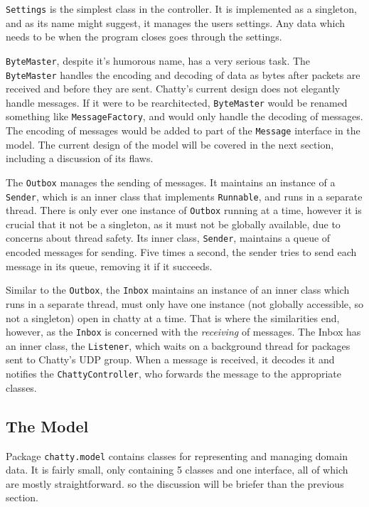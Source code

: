 \documentclass[oneside,article]{memoir}
\begin{document}
\texttt{Settings} is the simplest class in the controller. It is implemented
as a singleton, and as its name might suggest, it manages the users
settings. Any data which needs to be when the program closes goes
through the settings.

\texttt{ByteMaster}, despite it's humorous name, has a very serious task.
The \texttt{ByteMaster} handles the encoding and decoding of data as bytes
after packets are received and before they are sent. Chatty's current
design does not elegantly handle messages. If it were to be
rearchitected, \texttt{ByteMaster} would be renamed something like
\texttt{MessageFactory}, and would only handle the decoding of messages. The
encoding of messages would be added to part of the \texttt{Message} interface
in the model. The current design of the model will be covered in the
next section, including a discussion of its flaws.

The \texttt{Outbox} manages the sending of messages. It maintains an instance
of a \texttt{Sender}, which is an inner class that implements \texttt{Runnable}, and
runs in a separate thread. There is only ever one instance of
\texttt{Outbox} running at a time, however it is crucial that it not be a
singleton, as it must not be globally available, due to concerns about
thread safety. Its inner class, \texttt{Sender}, maintains a queue of
encoded messages for sending. Five times a second, the sender tries
to send each message in its queue, removing it if it succeeds.

Similar to the \texttt{Outbox}, the \texttt{Inbox} maintains an instance of an inner
class which runs in a separate thread, must only have one instance
(not globally accessible, so not a singleton) open in chatty at a
time. That is where the similarities end, however, as the \texttt{Inbox} is
concerned with the \emph{receiving} of messages. The Inbox has an inner
class, the \texttt{Listener}, which waits on a background thread for packages
sent to Chatty's UDP group. When a message is received, it decodes it
and notifies the \texttt{ChattyController}, who forwards the message to the
appropriate classes. 

\subsection{The Model}
\label{themodel}

Package \texttt{chatty.model} contains classes for representing and managing
domain data. It is fairly small, only containing 5 classes and one
interface, all of which are mostly straightforward. so the discussion
will be briefer than the previous section.
\end{document}
